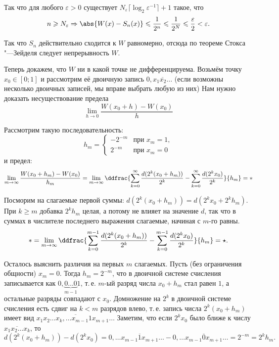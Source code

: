 \begin{solution}
    Так что для любого $\varepsilon > 0$ существует $N_\varepsilon \lceil\log_2\varepsilon^{-1}\rceil + 1$ такое, что \[n \geqslant N_\varepsilon \Rightarrow \abs{W(x) - S_n(x)} \leqslant \frac{1}{2^n} \leqslant \frac{1}{2^N} \leqslant \frac{\varepsilon}{2} < \varepsilon.\]

    Так что $S_n$ действительно сходится к $W$ равномерно, отсюда по теореме Стокса "---Зейделя следует непрерывность $W$.

    Теперь докажем, что $W$ ни в какой точке не дифференцируема. Возьмём точку $x_0 \in [0; 1]$ и рассмотрим её двоичную запись $0{,}\overline{x_1x_2\ldots}$ (если возможны несколько двоичных записей, мы вправе выбрать любую из них) Нам нужно доказать несуществование предела
    \[
        \lim_{h \to 0}\frac{W(x_0 + h) - W(x_0)}{h}
    \]

    Рассмотрим такую последовательность:
    \[
        h_m =
        \begin{cases}
            -2^{-m}&\text{при $x_m = 1$},\\
            2^{-m}&\text{при $x_m = 0$}
        \end{cases}
    \]
    и предел:
    \[
        \lim_{m \to \infty}\frac{W(x_0 + h_m) - W(x_0)}{h_m} = \lim_{m \to \infty}\ddfrac{\sum_{k = 0}^\infty\frac{d(2^k(x_0 + h_m))}{2^k} - \sum_{k = 0}^\infty\frac{d(2^kx_0)}{2^k}}{h_m} = \ast
    \]

    Посморим на слагаемые первой суммы: $d(2^k(x_0 + h_m)) = d(2^kx_0 + 2^kh_m)$. При $k \geqslant m$ добавка $2^kh_m$ целая, а потому не влияет на значение $d$, так что в суммах в числителе последнего выражения слагаемые, начиная с $m$-го равны.
    \[
        \ast = \lim_{m \to \infty}\ddfrac{\sum_{k = 0}^{m - 1}\frac{d(2^k(x_0 + h_m))}{2^k} - \sum_{k = 0}^{m - 1}\frac{d(2^kx_0)}{2^k}}{h_m} = \star.
    \]

    Осталось выяснить различия на первых $m$ слагаемых. Пусть (без ограничения общности) $x_m = 0$. Тогда $h_m = 2^{-m}$, что в двоичной системе счисления записывается как $0{,}\underbrace{0\ldots 0}_{m - 1}1$, т.\,е. $m$-ый разряд числа $x_0 + h_m$ стал равен $1$, а остальные разряды совпадают с $x_0$. Домножение на $2^k$ в двоичной системе счисления есть сдвиг на $k < m$ разрядов влево, т.\,е. запись числа $2^k(x_0 + h_m)$ имеет вид $\overline{x_1x_2\ldots x_k{,}\ldots x_{m - 1}1x_{m + 1}\ldots}$ Заметим, что если $2^kx_0$ было ближе к числу $\overline{x_1x_2\ldots x_k}$, то
    \[
        d(2^k(x_0 + h_m)) - d(2^kx_0) = 0{,}\overline{\ldots x_{m - 1}1x_{m + 1}\ldots} - 0{,}\overline{\ldots x_{m - 1}0x_{m + 1}\ldots} = 2^{-m} = 2^kh_m.
    \]


\end{solution}
